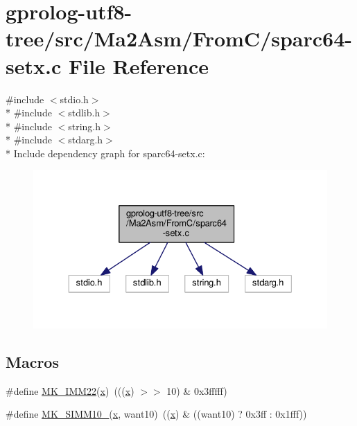 \hypertarget{sparc64-setx_8c}{}\section{gprolog-\/utf8-\/tree/src/\+Ma2\+Asm/\+From\+C/sparc64-\/setx.c File Reference}
\label{sparc64-setx_8c}
{\ttfamily \#include $<$stdio.\+h$>$}\\*
{\ttfamily \#include $<$stdlib.\+h$>$}\\*
{\ttfamily \#include $<$string.\+h$>$}\\*
{\ttfamily \#include $<$stdarg.\+h$>$}\\*
Include dependency graph for sparc64-\/setx.c\+:\nopagebreak
\begin{figure}[H]
\begin{center}
\leavevmode
\includegraphics[width=330pt]{sparc64-setx_8c__incl}
\end{center}
\end{figure}
\subsection*{Macros}
\begin{DoxyCompactItemize}
\item 
\#define \hyperlink{sparc64-setx_8c_a81a9e6ad68024dc29dcea31c3497dbca}{M\+K\+\_\+\+I\+M\+M22}(\hyperlink{asm__inst_8c_a6150e0515f7202e2fb518f7206ed97dc}{x})~(((\hyperlink{asm__inst_8c_a6150e0515f7202e2fb518f7206ed97dc}{x}) $>$$>$ 10) \& 0x3fffff)
\item 
\#define \hyperlink{sparc64-setx_8c_a59b653166cf9be443d113abcfa3fc195}{M\+K\+\_\+\+S\+I\+M\+M10\+\_}(\hyperlink{asm__inst_8c_a6150e0515f7202e2fb518f7206ed97dc}{x},  want10)~((\hyperlink{asm__inst_8c_a6150e0515f7202e2fb518f7206ed97dc}{x}) \& ((want10) ?  0x3ff \+: 0x1fff))
\end{DoxyCompactItemize}
